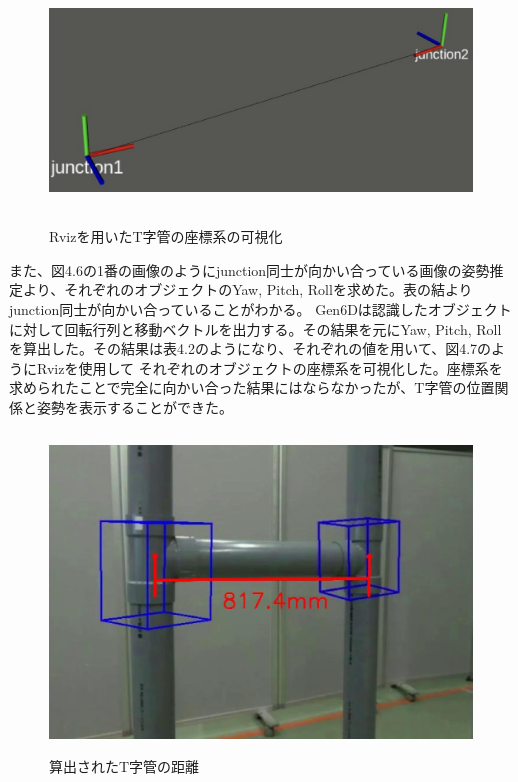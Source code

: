 \begin{table}[htbp]
\centering
\caption{物体検出ネットワークの実行結果}
\end{table}

\begin{figure}[htbt]
	\centering
	 \includegraphics[height=65mm]{rviz.eps}
	 \caption{Rvizを用いたT字管の座標系の可視化}
	 \label{fig:f2}
\end{figure}

また、図4.6の1番の画像のようにjunction同士が向かい合っている画像の姿勢推定より、それぞれのオブジェクトのYaw, Pitch, Rollを求めた。表の結よりjunction同士が向かい合っていることがわかる。
Gen6Dは認識したオブジェクトに対して回転行列と移動ベクトルを出力する。その結果を元にYaw, Pitch, Rollを算出した。その結果は表4.2のようになり、それぞれの値を用いて、図4.7のようにRvizを使用して
それぞれのオブジェクトの座標系を可視化した。座標系を求められたことで完全に向かい合った結果にはならなかったが、T字管の位置関係と姿勢を表示することができた。

\begin{figure}[htbt]
	\centering
	 \includegraphics[height=85mm]{scale.eps}
	 \caption{算出されたT字管の距離}
	 \label{fig:f2}
\end{figure}

